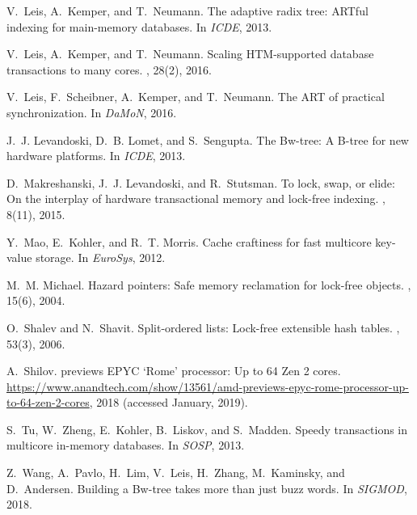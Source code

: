 \documentclass[11pt]{article}
\begin{document}
\begin{thebibliography}{10}
V.~Leis, A.~Kemper, and T.~Neumann.
\newblock The adaptive radix tree: {ARTful} indexing for main-memory databases.
\newblock In {\em ICDE}, 2013.

V.~Leis, A.~Kemper, and T.~Neumann.
\newblock Scaling {HTM}-supported database transactions to many cores.
, 28(2), 2016.

V.~Leis, F.~Scheibner, A.~Kemper, and T.~Neumann.
\newblock The {ART} of practical synchronization.
\newblock In {\em DaMoN}, 2016.

J.~J. Levandoski, D.~B. Lomet, and S.~Sengupta.
\newblock The {Bw}-tree: A {B}-tree for new hardware platforms.
\newblock In {\em ICDE}, 2013.

D.~Makreshanski, J.~J. Levandoski, and R.~Stutsman.
\newblock To lock, swap, or elide: On the interplay of hardware transactional
  memory and lock-free indexing.
, 8(11), 2015.

Y.~Mao, E.~Kohler, and R.~T. Morris.
\newblock Cache craftiness for fast multicore key-value storage.
\newblock In {\em EuroSys}, 2012.

M.~M. Michael.
\newblock Hazard pointers: Safe memory reclamation for lock-free objects.
, 15(6), 2004.

O.~Shalev and N.~Shavit.
\newblock Split-ordered lists: Lock-free extensible hash tables.
, 53(3), 2006.

A.~Shilov.
 previews {EPYC} ‘{Rome}’ processor: Up to 64 {Zen} 2 cores.
\newblock
  \url{https://www.anandtech.com/show/13561/amd-previews-epyc-rome-processor-up-to-64-zen-2-cores},
  2018 (accessed January, 2019).

S.~Tu, W.~Zheng, E.~Kohler, B.~Liskov, and S.~Madden.
\newblock Speedy transactions in multicore in-memory databases.
\newblock In {\em SOSP}, 2013.

Z.~Wang, A.~Pavlo, H.~Lim, V.~Leis, H.~Zhang, M.~Kaminsky, and D.~Andersen.
\newblock Building a {Bw}-tree takes more than just buzz words.
\newblock In {\em SIGMOD}, 2018.

\end{thebibliography}


%
%
\end{document}

